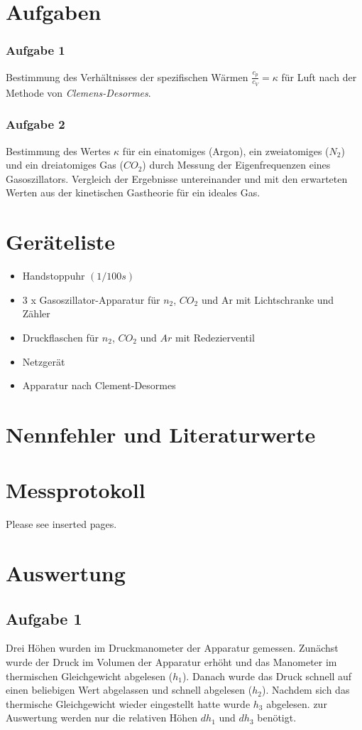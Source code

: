 \documentclass[%
   final,      %
   paper=a4, paper=portrait, pagesize=auto, %
   fontsize=11pt, %
   ngerman, %
 ]{scrartcl} %
\begin{document}
\section{Aufgaben}
\subsubsection{Aufgabe 1}
Bestimmung des Verhältnisses der spezifischen Wärmen $\frac{c_p}{c_V} = \kappa$ für Luft nach der Methode von \emph{Clemens-Desormes}.
\subsubsection{Aufgabe 2}
Bestimmung des Wertes $\kappa$ für ein einatomiges (Argon), ein zweiatomiges ($N_2$) und ein dreiatomiges Gas ($CO_2$) durch Messung der Eigenfrequenzen eines Gasoszillators.
Vergleich der Ergebnisse untereinander und mit den erwarteten Werten aus der kinetischen Gastheorie für ein ideales Gas.
\section{Geräteliste}
\begin{itemize}
\item
 Handstoppuhr $(1/100 s)$
\item 3 x Gasoszillator-Apparatur für $n_{2}$, $CO_{2}$ und Ar 
mit Lichtschranke und Zähler
\item Druckflaschen für $n_{2}$, $CO_{2}$ und $Ar$ mit Redezierventil
\item Netzgerät
\item Apparatur nach Clement-Desormes
\end{itemize}
\section{Nennfehler und Literaturwerte}
\section{Messprotokoll}
Please see inserted pages.
\section{Auswertung}
\subsection{Aufgabe 1}
Drei Höhen wurden im Druckmanometer der Apparatur gemessen. Zunächst wurde der Druck im Volumen der Apparatur erhöht und das Manometer im thermischen Gleichgewicht abgelesen ($h_1$). Danach wurde das Druck schnell auf einen beliebigen Wert abgelassen und schnell abgelesen ($h_2$). Nachdem sich das thermische Gleichgewicht wieder eingestellt hatte wurde $h_3$ abgelesen. zur Auswertung werden nur die relativen Höhen $dh_1$ und $dh_3$ benötigt.
\end{document}
